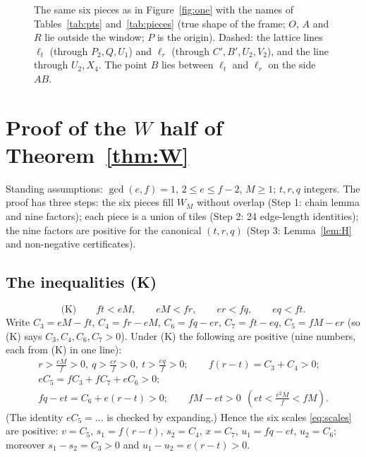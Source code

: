 \documentclass[11pt,reqno]{amsart}
\theoremstyle{plain}
\theoremstyle{definition}
\begin{document}
\begin{figure}[ht]
\centering

\caption{The same six pieces as in Figure~\ref{fig:one} with the names of Tables~\ref{tab:pts} and~\ref{tab:pieces} (true shape of the frame; $O$, $A$ and $R$ lie outside the window; $P$ is the origin). Dashed: the lattice lines $\ell_t$ (through $P_2,Q,U_1$) and $\ell_r$ (through $C',B',U_2,V_2$), and the line through $U_2,X_4$. The point $B$ lies between $\ell_t$ and $\ell_r$ on the side $AB$.}\label{fig:sym}
\end{figure}

\section{Proof of the $W$ half of Theorem~\ref{thm:W}}\label{sec:proof}
Standing assumptions: $\gcd(e,f)=1$, $2\le e\le f-2$, $M\ge1$; $t,r,q$ integers. The proof has three steps: the six pieces fill $W_M$ without overlap (Step 1: chain lemma and nine factors); each piece is a union of tiles (Step 2: 24 edge-length identities); the nine factors are positive for the canonical $(t,r,q)$ (Step 3: Lemma~\ref{lem:H} and non-negative certificates).

\subsection{The inequalities (K)}\label{sub:K}
\begin{equation}\label{eq:K}
\text{(K)}\qquad ft<eM,\qquad eM<fr,\qquad er<fq,\qquad eq<ft .
\end{equation}
Write $C_3=eM-ft$, $C_4=fr-eM$, $C_6=fq-er$, $C_7=ft-eq$, $C_5=fM-er$ (so (K) says $C_3,C_4,C_6,C_7>0$). Under (K) the following are positive (nine numbers, each from (K) in one line):
\begin{gather*}
r>\tfrac{eM}f>0,\ q>\tfrac{er}f>0,\ t>\tfrac{eq}f>0;\qquad f(r-t)=C_3+C_4>0;\\
eC_5=fC_3+fC_7+eC_6>0;\\ fq-et=C_6+e(r-t)>0;\qquad fM-et>0\ \ (et<\tfrac{e^2M}{f}<fM).
\end{gather*}
(The identity $eC_5=\dots$ is checked by expanding.) Hence the six scales \eqref{eq:scales} are positive: $v=C_5$, $s_1=f(r-t)$, $s_2=C_4$, $x=C_7$, $u_1=fq-et$, $u_2=C_6$; moreover $s_1-s_2=C_3>0$ and $u_1-u_2=e(r-t)>0$.
\end{document}
